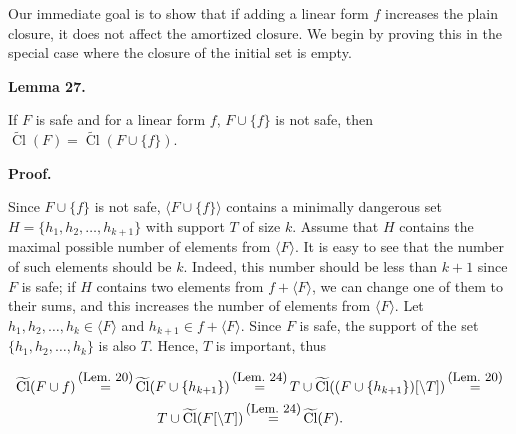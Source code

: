 Our immediate goal is to show that if adding a linear form $f$ increases the plain closure, it does not affect the amortized closure. We begin by proving this in the special case where the closure of the initial set is empty.\par



\par\medskip\noindent\textbf{
Lemma 27.
}\par



If $F$ is safe and for a linear form $f$, $F\cup\{f\}$ is not safe, then $\widetilde{\mathop{\mathrm{Cl}}}(F)=\widetilde{\mathop{\mathrm{Cl}}}(F\cup\{f\})$.\par



\par\medskip\noindent\textbf{Proof.}\par


Since $F\cup\{f\}$ is not safe, $\langle F\cup\{f\}\rangle$ contains a minimally dangerous set $H=\{h_{1},h_{2},\dots,h_{k+1}\}$ with support $T$ of size $k$. Assume that $H$ contains the maximal possible number of elements from $\langle F\rangle$. It is easy to see that the number of such elements should be $k$. Indeed, this number should be less than $k+1$ since $F$ is safe; if $H$ contains two elements from $f+\langle F\rangle$, we can change one of them to their sums, and this increases the number of elements from $\langle F\rangle$. Let $h_{1},h_{2},\dots,h_{k}\in\langle F\rangle$ and $h_{k+1}\in f+\langle F\rangle$.
Since $F$ is safe, the support of the set $\{h_{1},h_{2},\dots,h_{k}\}$ is also $T$. Hence, $T$ is important, thus\par





 
\[\begin{gathered}\widetilde{\mathop{\mathrm{Cl}}}(F\cup f)\mathop{=}\limits^{\mbox{\small(Lem.\leavevmode\nobreak\ 20)}}\widetilde{\mathop{\mathrm{Cl}}}(F\cup\{h_{k+1}\})\mathop{=}\limits^{\mbox{\small(Lem.\leavevmode\nobreak\ 24)}}T\cup\widetilde{\mathop{\mathrm{Cl}}}((F\cup\{h_{k+1}\})[\setminus T])\mathop{=}\limits^{\mbox{\small(Lem.\leavevmode\nobreak\ 20)}}\\
T\cup\widetilde{\mathop{\mathrm{Cl}}}(F[\setminus T])\mathop{=}\limits^{\mbox{\small(Lem.\leavevmode\nobreak\ 24)}}\widetilde{\mathop{\mathrm{Cl}}}(F).\quad\ \end{gathered}\] 
 




